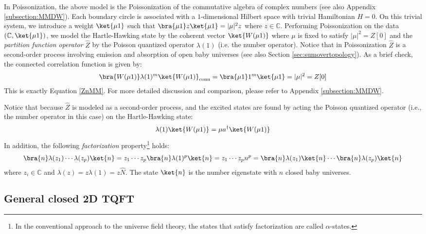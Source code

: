 \documentclass[a4paper,11pt]{article}
\theoremstyle{definition}
\numberwithin{equation}{section}
\begin{document}
In Poissonization, the above model is the Poissonization of the commutative algebra of complex numbers (see also Appendix \ref{subsection:MMDW}). Each boundary circle is associated with a $1$-dimensional Hilbert space with trivial Hamiltonian $H = 0$. On this trivial system, we introduce a weight $\ket{\mu 1}$ such that $\bra{\mu 1}z\ket{\mu 1} = |\mu|^2z$ where $z\in \mathbb{C}$. Performing Poissonization on the data $(\mathbb{C}, \ket{\mu 1})$, we model the Hartle-Hawking state by the coherent vector $\ket{W(\mu 1)}$ where $\mu$ is fixed to satisfy $|\mu|^2 = Z[0]$ and the \textit{partition function operator} $\widehat{Z}$ by the Poisson quantized operator $\lambda(1)$ (i.e. the number operator). Notice that in Poissonization $\widehat{Z}$ is a second-order process involving emission and absorption of open baby universes (see also Section \ref{sec:sumovertopology}). As a brief check, the connected correlation function is given by:
\begin{equation}
    \bra{W(\mu 1)}\lambda(1)^m\ket{W(\mu 1)}_\text{conn} = \bra{\mu 1}1^m\ket{\mu 1} = |\mu|^2 = Z[0]
\end{equation}
This is exactly Equation \ref{ZnMM}. For more detailed discussion and comparison, please refer to Appendix \ref{subsection:MMDW}.

Notice that because $\widehat{Z}$ is modeled as a second-order process, and the excited states are found by acting the Poisson quantized operator (i.e., the number operator in this case) on the Hartle-Hawking state:
\begin{equation}
    \lambda(1)\ket{W(\mu 1)} = \mu a^\dagger\ket{W(\mu 1)}
\end{equation}
In addition, the following \textit{factorization} property\footnote{In the conventional approach to the universe field theory, the states that satisfy factorization are called $\alpha$-states.} holds:
\begin{equation}
    \bra{n}\lambda(z_1)\cdots\lambda(z_p)\ket{n} = z_1\cdots z_p\bra{n}\lambda(1)^p\ket{n} = z_1\cdots z_pn^p = \bra{n}\lambda(z_1)\ket{n}\cdots\bra{n}\lambda(z_p)\ket{n}
\end{equation}
where $z_i\in\mathbb{C}$ and $\lambda(z) = z\lambda(1) = z\widehat{N}$. The state $\ket{n}$ is the number eigenstate with $n$ closed baby universes. 

\subsection{General closed 2D TQFT}\label{closedTQFFT}
\end{document}
